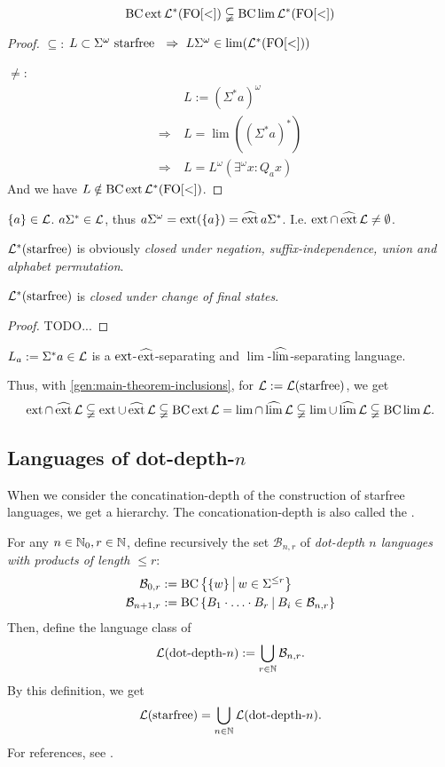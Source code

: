 \begin{theorem}
\[ \operatorname{BC} \operatorname{ext} \mathcal{L}^*( \mathrm{FO[<]} ) \subsetneqq \operatorname{BC} \lim \mathcal{L}^* ( \mathrm{FO[<]} ) \]
\begin{proof}
$\subseteq$: $L \subset \Sigma^\omega \text{ starfree } \ \Rightarrow\ L \Sigma^\omega \in \lim( \Lang^*( \mathrm{FO[<]} ) )$

$\neq$:
\begin{align*}
& L := (\Sigma^* a)^\omega \\
\Rightarrow \ & L = \lim( (\Sigma^* a)^* ) \\
\Rightarrow \ & L = L^\omega(\exists^\omega x : Q_a x)
\end{align*}
And we have $L \notin \operatorname{BC} \operatorname{ext} \mathcal{L}^* (\mathrm{FO[<]})$.
\end{proof}
\end{theorem}

$\Set{a} \in \Lang$. $a \Sigma^* \in \mathcal{L}$, thus $a\Sigma^\omega = \ext(\Set{a}) = \dext{a\Sigma^*}$. I.e. $\operatorname{ext} \cap \operatorname{\widehat{ext}} \mathcal{L} \ne \emptyset$.

$\mathcal{L}^*(\textup{\textrm{starfree}})$ is obviously \emph{closed under negation, suffix-independence, union and alphabet permutation}.

\begin{lemma}
$\mathcal{L}^*(\textup{\textrm{starfree}})$ is \emph{closed under change of final states}.
\begin{proof}
TODO...
\end{proof}
\end{lemma}

$L_a := \Sigma^* a \in \mathcal{L}$ is a $\operatorname{ext}$-$\operatorname{\widehat{ext}}$-separating and $\lim$-$\operatorname{\widehat{lim}}$-separating language.

Thus, with \cref{gen:main-theorem-inclusions}, for $\mathcal{L} := \mathcal{L}(\textup{\textrm{starfree}})$, we get
\[ \operatorname{ext} \cap \operatorname{\widehat{ext}} \mathcal{L} \subsetneqq
\operatorname{ext} \cup \operatorname{\widehat{ext}} \mathcal{L} \subsetneqq
\operatorname{BC} \operatorname{ext} \mathcal{L} =
\lim \cap \operatorname{\widehat{lim}} \mathcal{L} \subsetneqq
\lim \cup \operatorname{\widehat{lim}} \mathcal{L} \subsetneqq
\operatorname{BC} \lim \mathcal{L} . \]


\subsection{Languages of dot-depth-$n$}
\label{lang:dotdepth}
When we consider the concatination-depth of the construction of starfree languages, we get a hierarchy. The concationation-depth is also called the .

For any $n \in \mathbb{N}_0, r \in \mathbb{N}$, define recursively the set $\mathcal{B}_{n,r}$ of \emph{dot-depth $n$ languages with products of length $\le r$}:
\begin{align*}
\mathcal{B}_{0,r} & := \BC \Set{\Set{w}}{w \in \Sigma^{\le r}} \\
\mathcal{B}_{n+1,r} & := \BC \Set{B_1 \cdot \dotsc \cdot B_r}{B_i \in \mathcal{B}_{n,r}}
\end{align*}
Then, define the language class of 
\[ \mathcal{L}(\textup{\textrm{dot-depth-$n$}}) := \bigcup_{r\in\mathbb{N}} \mathcal{B}_{n,r} . \]
By this definition, we get
\[ \mathcal{L}(\textup{\textrm{starfree}}) = \bigcup_{n\in\mathbb{N}} \mathcal{L}(\textup{\textrm{dot-depth-$n$}}) . \]
For references, see \cite{ConcatGameDotDepth}.

